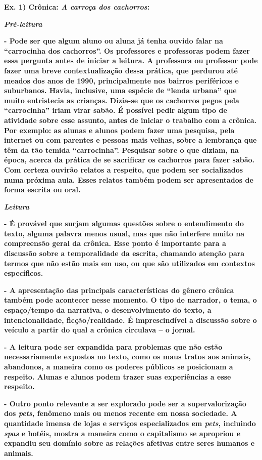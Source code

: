 \textbf{Ex. 1) Crônica: \emph{A carroça dos cachorros}:}

\emph{\textbf{Pré-leitura }}

\textbf{- Pode ser que algum aluno ou aluna já tenha ouvido falar na
``carrocinha dos cachorros''. Os professores e professoras podem fazer
essa pergunta antes de iniciar a leitura. A professora ou professor pode
fazer uma breve contextualização dessa prática, que perdurou até meados
dos anos de 1990, principalmente nos bairros periféricos e suburbanos.
Havia, inclusive, uma espécie de ``lenda urbana'' que muito entristecia
as crianças. Dizia-se que os cachorros pegos pela ``carrocinha'' iriam
virar sabão. É possível pedir algum tipo de atividade sobre esse
assunto, antes de iniciar o trabalho com a crônica. Por exemplo: as
alunas e alunos podem fazer uma pesquisa, pela internet ou com parentes
e pessoas mais velhas, sobre a lembrança que têm da tão temida
``carrocinha''. Pesquisar sobre o que diziam, na época, acerca da
prática de se sacrificar os cachorros para fazer sabão. Com certeza
ouvirão relatos a respeito, que podem ser socializados numa próxima
aula. Esses relatos também podem ser apresentados de forma escrita ou
oral. }

\emph{\textbf{Leitura}}

\textbf{- É provável que surjam algumas questões sobre o entendimento do
texto, alguma palavra menos usual, mas que não interfere muito na
compreensão geral da crônica. Esse ponto é importante para a discussão
sobre a temporalidade da escrita, chamando atenção para termos que não
estão mais em uso, ou que são utilizados em contextos específicos.}

\textbf{- A apresentação das principais características do gênero
crônica também pode acontecer nesse momento. O tipo de narrador, o tema,
o espaço/tempo da narrativa, o desenvolvimento do texto, a
intencionalidade, ficção/realidade. É imprescindível a discussão sobre o
veículo a partir do qual a crônica circulava -- o jornal. }

\textbf{- A leitura pode ser expandida para problemas que não estão
necessariamente expostos no texto, como os maus tratos aos animais,
abandonos, a maneira como os poderes públicos se posicionam a respeito.
Alunas e alunos podem trazer suas experiências a esse respeito.}

\textbf{- Outro ponto relevante a ser explorado pode ser a
supervalorização dos \emph{pets}, fenômeno mais ou menos recente em
nossa sociedade. A quantidade imensa de lojas e serviços especializados
em \emph{pets}, incluindo \emph{spas} e hotéis, mostra a maneira como o
capitalismo se apropriou e expandiu seu domínio sobre as relações
afetivas entre seres humanos e animais. }

